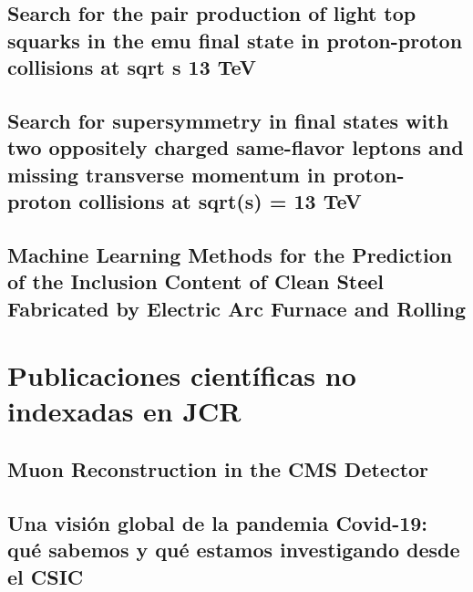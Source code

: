\documentclass[a4paper, 11pt, twoside, openright]{report}
\begin{document}
\subsection{Search for the pair production of light top squarks in the emu final state in proton-proton collisions at sqrt s 13 TeV}


\subsection{Search for supersymmetry in final states with two oppositely charged same-flavor leptons and missing transverse momentum in proton-proton collisions at sqrt(s) = 13 TeV}


\subsection{Machine Learning Methods for the Prediction of the Inclusion Content of Clean Steel Fabricated by Electric Arc Furnace and Rolling}



\section{Publicaciones científicas no indexadas en JCR}

\subsection{Muon Reconstruction in the CMS Detector}


\subsection{Una visión global de la pandemia Covid-19: qué sabemos y qué estamos investigando desde el CSIC}

\end{document}
